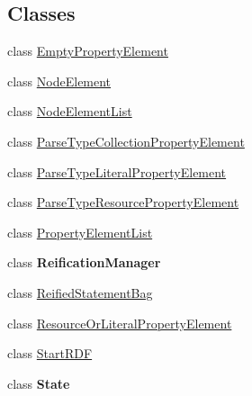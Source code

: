 \subsection*{Classes}
\begin{DoxyCompactItemize}
\item 
class \hyperlink{classorg_1_1semanticweb_1_1owlapi_1_1rdf_1_1syntax_1_1_r_d_f_parser_1_1_empty_property_element}{Empty\-Property\-Element}
\item 
class \hyperlink{classorg_1_1semanticweb_1_1owlapi_1_1rdf_1_1syntax_1_1_r_d_f_parser_1_1_node_element}{Node\-Element}
\item 
class \hyperlink{classorg_1_1semanticweb_1_1owlapi_1_1rdf_1_1syntax_1_1_r_d_f_parser_1_1_node_element_list}{Node\-Element\-List}
\item 
class \hyperlink{classorg_1_1semanticweb_1_1owlapi_1_1rdf_1_1syntax_1_1_r_d_f_parser_1_1_parse_type_collection_property_element}{Parse\-Type\-Collection\-Property\-Element}
\item 
class \hyperlink{classorg_1_1semanticweb_1_1owlapi_1_1rdf_1_1syntax_1_1_r_d_f_parser_1_1_parse_type_literal_property_element}{Parse\-Type\-Literal\-Property\-Element}
\item 
class \hyperlink{classorg_1_1semanticweb_1_1owlapi_1_1rdf_1_1syntax_1_1_r_d_f_parser_1_1_parse_type_resource_property_element}{Parse\-Type\-Resource\-Property\-Element}
\item 
class \hyperlink{classorg_1_1semanticweb_1_1owlapi_1_1rdf_1_1syntax_1_1_r_d_f_parser_1_1_property_element_list}{Property\-Element\-List}
\item 
class {\bfseries Reification\-Manager}
\item 
class \hyperlink{classorg_1_1semanticweb_1_1owlapi_1_1rdf_1_1syntax_1_1_r_d_f_parser_1_1_reified_statement_bag}{Reified\-Statement\-Bag}
\item 
class \hyperlink{classorg_1_1semanticweb_1_1owlapi_1_1rdf_1_1syntax_1_1_r_d_f_parser_1_1_resource_or_literal_property_element}{Resource\-Or\-Literal\-Property\-Element}
\item 
class \hyperlink{classorg_1_1semanticweb_1_1owlapi_1_1rdf_1_1syntax_1_1_r_d_f_parser_1_1_start_r_d_f}{Start\-R\-D\-F}
\item 
class {\bfseries State}
\end{DoxyCompactItemize}
